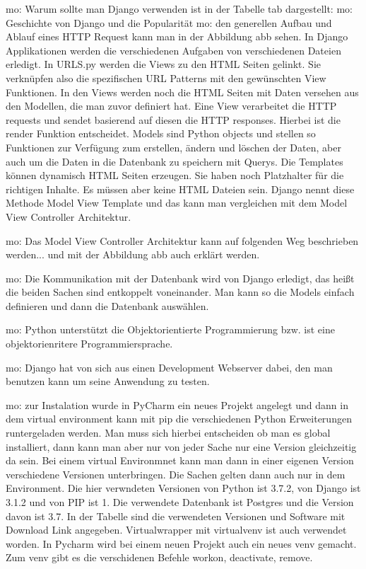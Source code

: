 \documentclass[11pt,a4paper]{report}
\begin{document}
mo: Warum sollte man Django verwenden ist in der Tabelle tab dargestellt:
mo: Geschichte von Django und die Popularität
mo: den generellen Aufbau und Ablauf eines HTTP Request kann man in der Abbildung abb sehen. In Django Applikationen werden die verschiedenen Aufgaben von verschiedenen Dateien erledigt. In URLS.py werden die Views zu den HTML Seiten gelinkt. Sie verknüpfen also die spezifischen URL Patterns mit den gewünschten View Funktionen. In den Views werden noch die HTML Seiten mit Daten versehen aus den Modellen, die man zuvor definiert hat. Eine View verarbeitet die HTTP requests und sendet basierend auf diesen die HTTP responses. Hierbei ist die render Funktion entscheidet. Models sind Python objects und stellen so Funktionen zur Verfügung zum erstellen, ändern und löschen der Daten, aber auch um die Daten in die Datenbank zu speichern mit Querys. Die Templates können dynamisch HTML Seiten erzeugen. Sie haben noch Platzhalter für die richtigen Inhalte. Es müssen aber keine HTML Dateien sein. Django nennt diese Methode Model View Template und das kann man vergleichen mit dem Model View Controller Architektur.

mo: Das Model View Controller Architektur kann auf folgenden Weg beschrieben werden... und mit der Abbildung abb auch erklärt werden.

mo: Die Kommunikation mit der Datenbank wird von Django erledigt, das heißt die beiden Sachen sind entkoppelt voneinander. Man kann so die Models einfach definieren und dann die Datenbank auswählen. 

mo: Python unterstützt die Objektorientierte Programmierung bzw. ist eine objektorienritere Programmiersprache. 

mo: Django hat von sich aus einen Development Webserver dabei, den man benutzen kann um seine Anwendung zu testen. 

mo: zur Instalation wurde in PyCharm ein neues Projekt angelegt und dann in dem virtual environment kann mit pip die verschiedenen Python Erweiterungen runtergeladen werden. Man muss sich hierbei entscheiden ob man es global installiert, dann kann man aber nur von jeder Sache nur eine Version gleichzeitig da sein. Bei einem virtual Environmnet kann man dann in einer eigenen Version verschiedene Versionen unterbringen. Die Sachen gelten dann auch nur in dem Environment. Die hier verwndeten Versionen von Python ist 3.7.2, von Django ist 3.1.2 und von PIP ist 1. Die verwendete Datenbank ist Postgres und die Version davon ist 3.7. In der Tabelle sind die verwendeten Versionen und Software mit Download Link angegeben. Virtualwrapper mit virtualvenv ist auch verwendet worden. In Pycharm wird bei einem neuen Projekt auch ein neues venv gemacht. Zum venv gibt es die verschidenen Befehle workon, deactivate, remove. 
\end{document}
